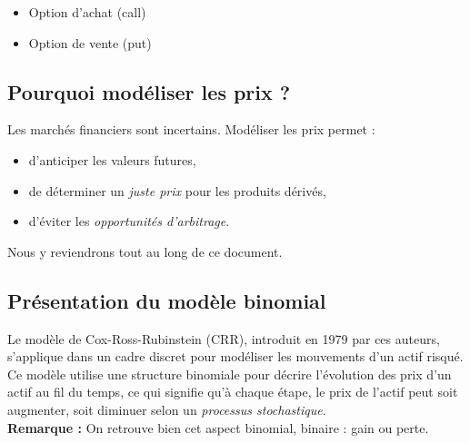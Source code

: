 \documentclass[12pt,a4paper]{article}
\begin{document}
\begin{itemize}
  \item Option d'achat (call)
  \item Option de vente (put)
\end{itemize}

\subsection{Pourquoi modéliser les prix ?}
Les marchés financiers sont incertains. Modéliser les prix permet :
\begin{itemize}
  \item d'anticiper les valeurs futures,
  \item de déterminer un \textit{juste prix} pour les produits dérivés,
  \item d'éviter les \textit{opportunités d'arbitrage}.
\end{itemize}
Nous y reviendrons tout au long de ce document.

\subsection{Présentation du modèle binomial}
Le modèle de Cox-Ross-Rubinstein (CRR), introduit en 1979 par ces auteurs, s'applique dans un cadre discret pour modéliser les mouvements d'un actif risqué. Ce modèle utilise une structure binomiale pour décrire l'évolution des prix d'un actif au fil du temps, ce qui signifie qu'à chaque étape, le prix de l'actif peut soit augmenter, soit diminuer selon un \textit{processus stochastique}.\\
\textbf{Remarque : } On retrouve bien cet aspect binomial, binaire : gain ou perte.

\begin{center}
\end{center}
\end{document}
